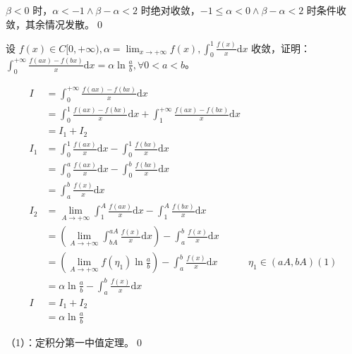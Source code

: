 $\displaystyle \beta < 0$ 时，$\displaystyle \alpha < -1\land \beta -\alpha < 2$ 时绝对收敛，$\displaystyle -1\leqslant \alpha < 0\land \beta -\alpha < 2$ 时条件收敛，其余情况发散。\qed 



\begin{ques}
	设 $\displaystyle f( x) \in C[ 0,+\infty ) ,\alpha =\lim _{x\rightarrow +\infty } f( x) ,\int _{0}^{1}\frac{f( x)}{x}\mathrm{d} x$ 收敛，证明：$\displaystyle \int _{0}^{+\infty }\frac{f( ax) -f( bx)}{x}\mathrm{d} x=\alpha \ln\frac{a}{b} ,\forall 0< a< b$。
\end{ques}


\begin{align*}
	I & =\int _{0}^{+\infty }\frac{f( ax) -f( bx)}{x}\mathrm{d} x & \\
	& =\int _{0}^{1}\frac{f( ax) -f( bx)}{x}\mathrm{d} x+\int _{1}^{+\infty }\frac{f( ax) -f( bx)}{x}\mathrm{d} x & \\
	& =I_{1} +I_{2} & \\
	I_{1} & =\int _{0}^{1}\frac{f( ax)}{x}\mathrm{d} x-\int _{0}^{1}\frac{f( bx)}{x}\mathrm{d} x & \\
	& =\int _{0}^{a}\frac{f( ax)}{x}\mathrm{d} x-\int _{0}^{b}\frac{f( bx)}{x}\mathrm{d} x & \\
	& =\int _{a}^{b}\frac{f( x)}{x}\mathrm{d} x & \\
	I_{2} & =\lim _{A\rightarrow +\infty }\int _{1}^{A}\frac{f( ax)}{x}\mathrm{d} x-\int _{1}^{A}\frac{f( bx)}{x}\mathrm{d} x & \\
	& =\left(\lim _{A\rightarrow +\infty }\int _{bA}^{aA}\frac{f( x)}{x}\mathrm{d} x\right) -\int _{a}^{b}\frac{f( x)}{x}\mathrm{d} x & \\
	& =\left(\lim _{A\rightarrow +\infty } f( \eta _{1})\ln\frac{a}{b}\right) -\int _{a}^{b}\frac{f( x)}{x}\mathrm{d} x & \eta _{1} \in ( aA,bA)( 1)\\
	& =\alpha \ln\frac{a}{b} -\int _{a}^{b}\frac{f( x)}{x}\mathrm{d} x & \\
	I & =I_{1} +I_{2} & \\
	& =\alpha \ln\frac{a}{b} & 
\end{align*}


（1）：定积分第一中值定理。\qed 
\ifx\allfiles\undefined

\fi